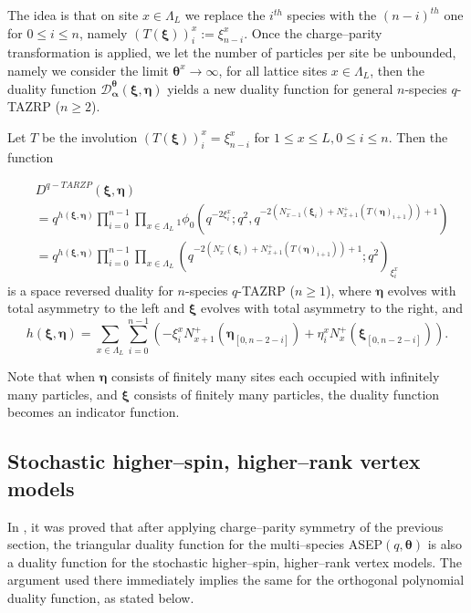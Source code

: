\documentclass{ximera}
\begin{document}
The idea is that on site $x \in \Lambda_L$ we replace the $i^{th}$ species with the $(n-i)^{th}$ one  for $0\le i\le n$, namely  $(T(\boldsymbol\xi))^x_i:=\xi^x_{n-i}.$ Once the charge--parity transformation is applied,  we let the number of particles per site be unbounded,  namely we consider the limit $\mathbf\theta^x\rightarrow \infty$, for all lattice sites $x \in \Lambda_L$, then the duality function $\mathcal{D}_{\boldsymbol{\alpha}}^{\boldsymbol\theta} (\boldsymbol\xi,\boldsymbol\eta)$ yields a new duality function for general $n$-species  $q$-TAZRP ($n\ge 2$).



\begin{theorem}\label{qTAZRP}
Let $T$ be the involution $(T(\boldsymbol\xi))^x_i=\xi^x_{n-i}$ for $1\le x\le L,0\le i\le n$. Then the function

\begin{align}
& D^{q-TARZP}(\boldsymbol\xi,\boldsymbol\eta)  \nonumber  \\ & = q^{h(\boldsymbol\xi,\boldsymbol\eta)} \prod_{i=0}^{n-1}\prod_{x \in \Lambda_L}{}_1\phi_0\left(q^{-2\xi_i^x};q^2,q^{-2\left(N_{x-1}^-(\boldsymbol\xi_i)+N_{x+1}^+(T(\boldsymbol\eta)_{i+1})\right)+1}\right)    \nonumber    \\
   &=  q^{h(\boldsymbol\xi,\boldsymbol\eta)} \prod_{i=0}^{n-1}\prod_{x \in \Lambda_L} ( q^{-2\left(N_{x}^-(\boldsymbol\xi_i)+N_{x+1}^+(T(\boldsymbol\eta)_{i+1})\right)+1} ;q^2  )_{\xi_i^x}   \label{dualityq-TARZP} 
\end{align}
is a space reversed duality for $n $-species $q$-TAZRP ($n\ge 1$), where $\boldsymbol\eta$ evolves with total asymmetry to the left and $\boldsymbol\xi$ evolves with total asymmetry to the right, and 
\begin{equation}\label{eq:1}
    h(\boldsymbol\xi,\boldsymbol\eta)=\sum_{x \in \Lambda_L}\sum_{i=0}^{n-1}\left(-\xi_i^xN_{x+1}^+(\boldsymbol\eta_{[0,n-2-i]})+\eta_i^xN_{x}^+(\boldsymbol\xi_{[0,n-2-i]})\right).
\end{equation}
\end{theorem}
Note that when $\boldsymbol\eta$ consists of finitely many sites each occupied with infinitely many particles, and $\boldsymbol\xi$ consists of finitely many particles, the duality function becomes an indicator function.


\subsection{Stochastic higher--spin, higher--rank vertex models}
 In \cite{KuanCMP}, it was proved that after applying charge--parity symmetry of the previous section,  the triangular duality function for the multi--species ASEP$(q,\boldsymbol\theta)$ is also a duality function for the stochastic higher--spin, higher--rank vertex models. The argument used there immediately implies the same for the orthogonal polynomial duality function, as stated below.
\end{document}
